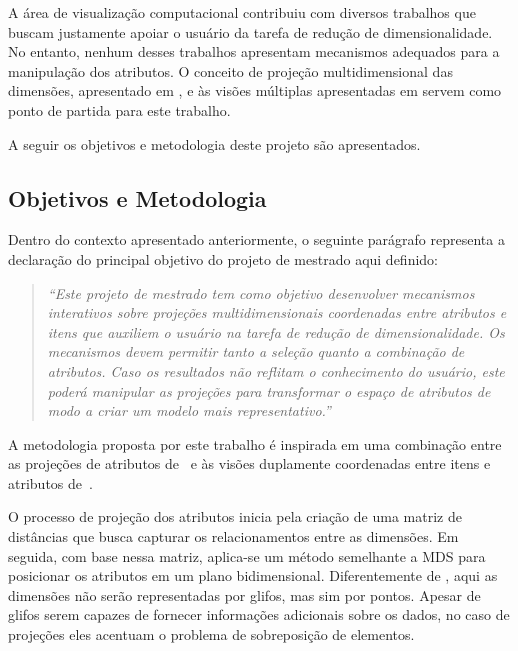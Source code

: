 
A área de visualização computacional contribuiu com diversos trabalhos que buscam justamente apoiar o usuário da tarefa de redução de dimensionalidade. No entanto, nenhum desses trabalhos apresentam mecanismos adequados para a manipulação dos atributos. O conceito de projeção multidimensional das dimensões, apresentado em \cite{Yang2007}, e às visões múltiplas apresentadas em \cite{Turkay2011} servem como ponto de partida para este trabalho.

A seguir os objetivos e metodologia deste projeto são apresentados.

\subsection{Objetivos e Metodologia}

Dentro do contexto apresentado anteriormente, o seguinte parágrafo representa a declaração do principal objetivo do projeto de mestrado aqui definido:

\begin{quote}
\emph{``Este projeto de mestrado tem como objetivo desenvolver mecanismos interativos sobre projeções multidimensionais coordenadas entre atributos e itens que auxiliem o usuário na tarefa de redução de dimensionalidade. Os mecanismos devem permitir tanto a seleção quanto a combinação de atributos. Caso os resultados não reflitam o conhecimento do usuário, este poderá manipular as projeções para transformar o espaço de atributos de modo a criar um modelo mais representativo.''}
\end{quote}

A metodologia proposta por este trabalho é inspirada em uma combinação entre as projeções de atributos de~\cite{Yang2004} e às visões duplamente coordenadas entre itens e atributos      de~\cite{Turkay2011}.

O processo de projeção dos atributos inicia pela criação de uma matriz de distâncias que     busca capturar os relacionamentos entre as dimensões. Em seguida, com base nessa matriz,     aplica-se um método semelhante a MDS para posicionar os atributos em um plano bidimensional. Diferentemente de \cite{Yang2004}, aqui as dimensões não serão representadas por glifos, mas sim por pontos. Apesar de glifos serem capazes de fornecer informações adicionais sobre os   dados, no caso de projeções eles acentuam o problema de sobreposição de elementos.


